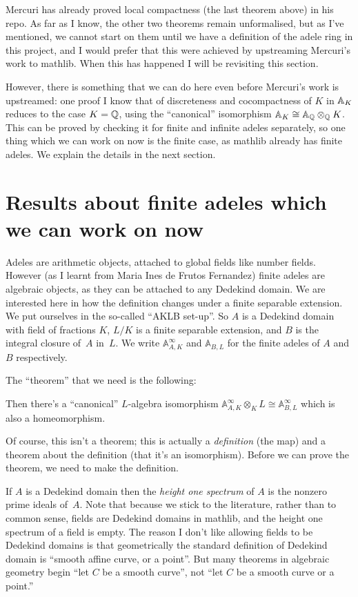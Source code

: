 Mercuri has already proved local compactness (the last theorem above) in his repo.
As far as I know, the other
two theorems remain unformalised, but as I've mentioned, we cannot start on them until
we have a definition of the adele ring in this project, and I would prefer
that this were achieved by upstreaming Mercuri's work to mathlib. When this has
happened I will be revisiting this section.

However, there is something that we can do here even before Mercuri's work
is upstreamed: one proof I know that of discreteness
and cocompactness of $K$ in $\mathbb{A}_K$ reduces to the case $K=\mathbb{Q}$, using the ``canonical''
isomorphism $\mathbb{A}_K\cong\mathbb{A}_{\mathbb{Q}}\otimes_{\mathbb{Q}}K$. This can be proved by checking it for finite
and infinite adeles separately, so one thing which we can work on now is the finite case,
as mathlib already has finite adeles. We explain the details in the next section.

\section{Results about finite adeles which we can work on now}

Adeles are arithmetic objects, attached to global fields like number fields.
However (as I learnt from Maria Ines de Frutos Fernandez) finite adeles are algebraic
objects, as they can be attached to any Dedekind domain. We are interested here in how
the definition changes under a finite separable extension. We put ourselves in
the so-called ``AKLB set-up''. So $A$ is a Dedekind domain with field of fractions $K$,
$L/K$ is a finite separable extension, and $B$ is the integral closure of~$A$
in~$L$. We write $\mathbb{A}_{A,K}^\infty$ and $\mathbb{A}_{B,L}$ for the finite
adeles of $A$ and $B$ respectively.

The ``theorem'' that we need is the following:

\begin{theorem}
  Then there's a ``canonical'' $L$-algebra isomorphism
  $\mathbb{A}_{A,K}^\infty \otimes_KL\cong\mathbb{A}_{B,L}^\infty$
  which is also a homeomorphism.
\end{theorem}

Of course, this isn't a theorem; this is actually a \emph{definition} (the map) and a theorem about
the definition (that it's an isomorphism). Before we can prove the theorem, we need to make the
definition.

If $A$ is a Dedekind domain then the \emph{height one spectrum} of $A$ is
the nonzero prime ideals of~$A$. Note that because we stick to the literature,
rather than to common sense, fields are Dedekind domains in mathlib, and the
height one spectrum of a field is empty. The reason I don't like allowing fields
to be Dedekind domains is that geometrically the standard definition of Dedekind
domain is ``smooth affine curve, or a point''. But many theorems in algebraic geometry
begin ``let $C$ be a smooth curve'', not ``let $C$ be a smooth curve or a point.''

